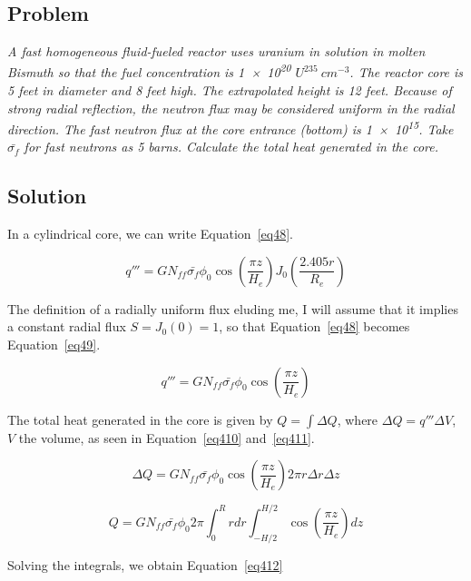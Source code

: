 \subsection{Problem}
\textit{A fast homogeneous fluid-fueled reactor uses uranium in solution in molten Bismuth so that the fuel concentration is \num{1e20} $U^{235}\ cm^{-3}$. The reactor core is 5 feet in diameter and 8 feet high. The extrapolated height is 12 feet. Because of strong radial reflection, the neutron flux may be considered uniform in the radial direction. The fast neutron flux at the core entrance (bottom) is \num{1e15}. Take $\bar{\sigma_f}$ for fast neutrons as 5 barns. Calculate the total heat generated in the core.}

\subsection{Solution}

In a cylindrical core, we can write Equation~\ref{eq48}.

\begin{equation}\label{eq48}
q''' = G N_{ff} \bar{\sigma_{f}} \phi_0 \cos(\frac{\pi z}{H_e}) J_0(\frac{2.405r}{R_e})
\end{equation}

The definition of a radially uniform flux eluding me, I will assume that it implies a constant radial flux $S = J_0(0) = 1$, so that Equation~\ref{eq48} becomes Equation~\ref{eq49}.

\begin{equation}\label{eq49}
q''' = G N_{ff} \bar{\sigma_{f}} \phi_0 \cos(\frac{\pi z}{H_e})
\end{equation}

The total heat generated in the core is given by $Q = \int \Delta Q$, where $\Delta Q = q''' \Delta V$, $V$ the volume, as seen in Equation~\ref{eq410} and~\ref{eq411}.


\begin{equation}\label{eq410}
\Delta Q = G N_{ff} \bar{\sigma_{f}} \phi_0 \cos(\frac{\pi z}{H_e}) 2\pi r\Delta r \Delta z
\end{equation}


\begin{equation}\label{eq411}
Q = G N_{ff} \bar{\sigma_{f}} \phi_0 2\pi \int_0^{R} r dr \int_{-H/2}^{H/2} \cos(\frac{\pi z}{H_e}) dz
\end{equation}

Solving the integrals, we obtain Equation~\ref{eq412}

